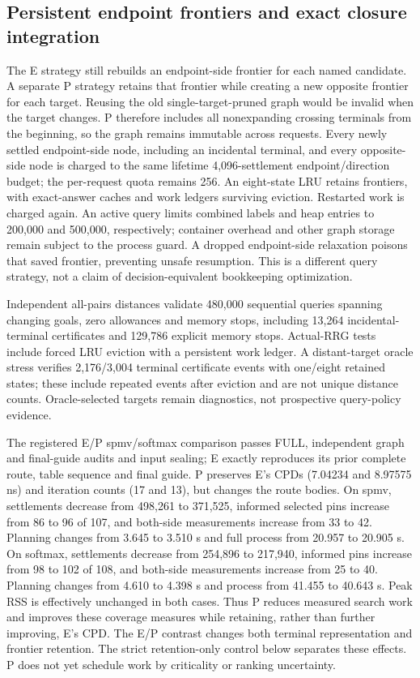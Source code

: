 \documentclass[conference,10pt]{IEEEtran}
\begin{document}
\subsection{Persistent endpoint frontiers and exact closure integration}
The E strategy still rebuilds an endpoint-side frontier for each named candidate. A separate P strategy retains that frontier while creating a new opposite frontier for each target. Reusing the old single-target-pruned graph would be invalid when the target changes. P therefore includes all nonexpanding crossing terminals from the beginning, so the graph remains immutable across requests. Every newly settled endpoint-side node, including an incidental terminal, and every opposite-side node is charged to the same lifetime 4,096-settlement endpoint/direction budget; the per-request quota remains 256. An eight-state LRU retains frontiers, with exact-answer caches and work ledgers surviving eviction. Restarted work is charged again. An active query limits combined labels and heap entries to 200,000 and 500,000, respectively; container overhead and other graph storage remain subject to the process guard. A dropped endpoint-side relaxation poisons that saved frontier, preventing unsafe resumption. This is a different query strategy, not a claim of decision-equivalent bookkeeping optimization.

Independent all-pairs distances validate 480,000 sequential queries spanning changing goals, zero allowances and memory stops, including 13,264 incidental-terminal certificates and 129,786 explicit memory stops. Actual-RRG tests include forced LRU eviction with a persistent work ledger. A distant-target oracle stress verifies 2,176/3,004 terminal certificate events with one/eight retained states; these include repeated events after eviction and are not unique distance counts. Oracle-selected targets remain diagnostics, not prospective query-policy evidence.

The registered E/P spmv/softmax comparison passes FULL, independent graph and final-guide audits and input sealing; E exactly reproduces its prior complete route, table sequence and final guide. P preserves E's CPDs (7.04234 and 8.97575 ns) and iteration counts (17 and 13), but changes the route bodies. On spmv, settlements decrease from 498,261 to 371,525, informed selected pins increase from 86 to 96 of 107, and both-side measurements increase from 33 to 42. Planning changes from 3.645 to 3.510 s and full process from 20.957 to 20.905 s. On softmax, settlements decrease from 254,896 to 217,940, informed pins increase from 98 to 102 of 108, and both-side measurements increase from 25 to 40. Planning changes from 4.610 to 4.398 s and process from 41.455 to 40.643 s. Peak RSS is effectively unchanged in both cases. Thus P reduces measured search work and improves these coverage measures while retaining, rather than further improving, E's CPD. The E/P contrast changes both terminal representation and frontier retention. The strict retention-only control below separates these effects. P does not yet schedule work by criticality or ranking uncertainty.
\end{document}
